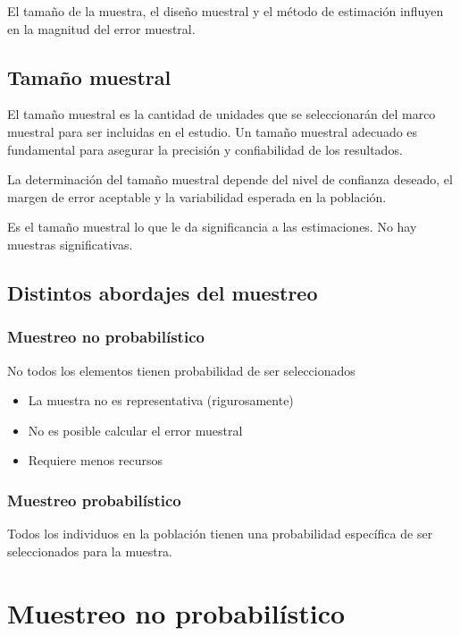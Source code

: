 \documentclass[
  letterpaper,
  DIV=11,
  numbers=noendperiod]{scrreprt}
\providecommand{\tightlist}{%
  \setlength{\itemsep}{0pt}\setlength{\parskip}{0pt}}\usepackage{longtable,booktabs,array}
\begin{document}
El tamaño de la muestra, el diseño muestral y el método de estimación
influyen en la magnitud del error muestral.

\section{Tamaño muestral}\label{tamauxf1o-muestral}

El tamaño muestral es la cantidad de unidades que se seleccionarán del
marco muestral para ser incluidas en el estudio. Un tamaño muestral
adecuado es fundamental para asegurar la precisión y confiabilidad de
los resultados.

La determinación del tamaño muestral depende del nivel de confianza
deseado, el margen de error aceptable y la variabilidad esperada en la
población.

Es el tamaño muestral lo que le da significancia a las estimaciones. No
hay muestras significativas.

\section{Distintos abordajes del
muestreo}\label{distintos-abordajes-del-muestreo}

\subsection{Muestreo no
probabilístico}\label{muestreo-no-probabiluxedstico}

No todos los elementos tienen probabilidad de ser seleccionados

\begin{itemize}
\tightlist
\item
  La muestra no es representativa (rigurosamente)
\item
  No es posible calcular el error muestral
\item
  Requiere menos recursos
\end{itemize}

\subsection{Muestreo probabilístico}\label{muestreo-probabiluxedstico}

Todos los individuos en la población tienen una probabilidad específica
de ser seleccionados para la muestra.

\chapter{Muestreo no
probabilístico}\label{muestreo-no-probabiluxedstico-1}
\end{document}
